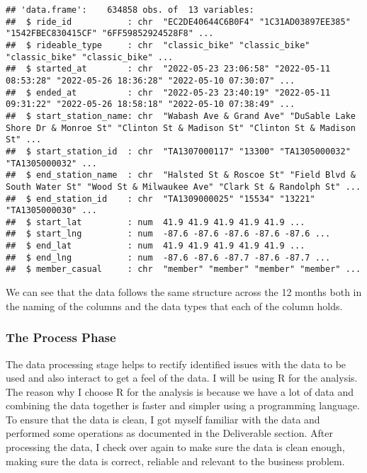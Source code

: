 \documentclass[
]{article}
\begin{document}
\begin{verbatim}
## 'data.frame':    634858 obs. of  13 variables:
##  $ ride_id           : chr  "EC2DE40644C6B0F4" "1C31AD03897EE385" "1542FBEC830415CF" "6FF59852924528F8" ...
##  $ rideable_type     : chr  "classic_bike" "classic_bike" "classic_bike" "classic_bike" ...
##  $ started_at        : chr  "2022-05-23 23:06:58" "2022-05-11 08:53:28" "2022-05-26 18:36:28" "2022-05-10 07:30:07" ...
##  $ ended_at          : chr  "2022-05-23 23:40:19" "2022-05-11 09:31:22" "2022-05-26 18:58:18" "2022-05-10 07:38:49" ...
##  $ start_station_name: chr  "Wabash Ave & Grand Ave" "DuSable Lake Shore Dr & Monroe St" "Clinton St & Madison St" "Clinton St & Madison St" ...
##  $ start_station_id  : chr  "TA1307000117" "13300" "TA1305000032" "TA1305000032" ...
##  $ end_station_name  : chr  "Halsted St & Roscoe St" "Field Blvd & South Water St" "Wood St & Milwaukee Ave" "Clark St & Randolph St" ...
##  $ end_station_id    : chr  "TA1309000025" "15534" "13221" "TA1305000030" ...
##  $ start_lat         : num  41.9 41.9 41.9 41.9 41.9 ...
##  $ start_lng         : num  -87.6 -87.6 -87.6 -87.6 -87.6 ...
##  $ end_lat           : num  41.9 41.9 41.9 41.9 41.9 ...
##  $ end_lng           : num  -87.6 -87.6 -87.7 -87.6 -87.7 ...
##  $ member_casual     : chr  "member" "member" "member" "member" ...
\end{verbatim}

We can see that the data follows the same structure across the 12 months
both in the naming of the columns and the data types that each of the
column holds.

\hypertarget{the-process-phase}{%
\subsubsection{The Process Phase}\label{the-process-phase}}

The data processing stage helps to rectify identified issues with the
data to be used and also interact to get a feel of the data. I will be
using R for the analysis. The reason why I choose R for the analysis is
because we have a lot of data and combining the data together is faster
and simpler using a programming language. To ensure that the data is
clean, I got myself familiar with the data and performed some operations
as documented in the Deliverable section. After processing the data, I
check over again to make sure the data is clean enough, making sure the
data is correct, reliable and relevant to the business problem.
\end{document}
